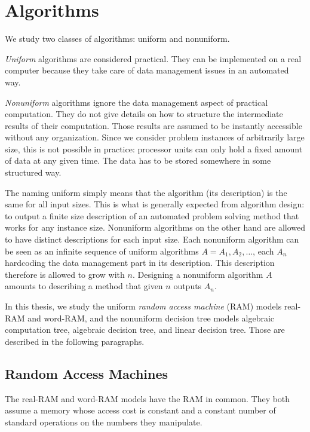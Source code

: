 \section{Algorithms}\label{sec:models-of-computation:algorithms}

We study two classes of algorithms: uniform and nonuniform.

\emph{Uniform} algorithms are considered practical. They can be implemented on
a real computer because they take care of data management issues in an
automated way.

\emph{Nonuniform} algorithms ignore the data management aspect of practical
computation. They do not give details on how to structure the intermediate
results of their computation. Those results are assumed to be instantly
accessible without any organization. Since we consider problem instances of
arbitrarily large size, this is not possible in practice:
processor units can only hold a fixed amount of data at any given time. The
data has to be stored somewhere in some structured way.

The naming uniform simply means that the algorithm (its description) is the
same for all input sizes. This is what is generally expected from algorithm
design: to output a finite size description of an automated problem solving
method that works for any instance size.
%
Nonuniform algorithms on the other hand are allowed to have distinct
descriptions for each input size. Each nonuniform algorithm can be seen as an
infinite sequence of uniform algorithms \(A = A_1, A_2, \ldots\), each \(A_n\)
hardcoding the data management part in its description. This description
therefore is allowed to grow with \(n\).
Designing a nonuniform algorithm \(A\) amounts to describing a method
that given \(n\) outputs \(A_n\).

In this thesis, we study the uniform \emph{random access machine} (RAM) models
real-RAM and word-RAM, and the nonuniform decision tree models algebraic
computation tree, algebraic decision tree, and linear decision tree. Those are
described in the following paragraphs.

\subsection{Random Access Machines}\label{sec:models-of-computation:algorithms:ram}

The real-RAM and word-RAM models have the RAM in common. They both assume
a memory whose access cost is constant and a constant number of standard
operations on the numbers they manipulate.

